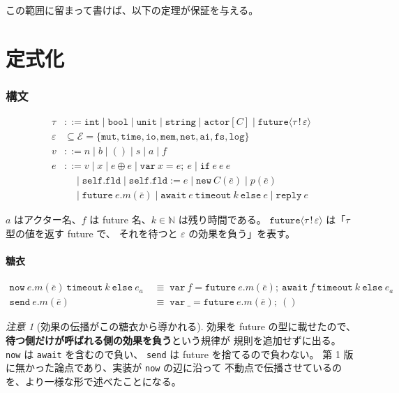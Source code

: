 \documentclass[11pt,a4paper]{ltjsarticle}
\theoremstyle{definition}
\theoremstyle{remark}
\newtheorem{remark}[theorem]{注意}
\newcommand{\tint}{\ensuremath{\mathtt{int}}}
\newcommand{\tbool}{\ensuremath{\mathtt{bool}}}
\newcommand{\tunit}{\ensuremath{\mathtt{unit}}}
\newcommand{\tstr}{\ensuremath{\mathtt{string}}}
\newcommand{\tact}[1]{\ensuremath{\mathtt{actor}[#1]}}
\newcommand{\tfut}[2]{\ensuremath{\mathtt{future}\langle #1 \,!\, #2 \rangle}}
\newcommand{\Eff}{\mathcal{E}}
\begin{document}
この範囲に留まって書けば、以下の定理が保証を与える。

\part{定式化}
\label{part:form}

\section{構文}

\begin{align*}
\tau &::= \tint \mid \tbool \mid \tunit \mid \tstr
        \mid \tact{C} \mid \tfut{\tau}{\varepsilon} \\
\varepsilon &\subseteq \Eff = \{\mathtt{mut},\mathtt{time},\mathtt{io},
        \mathtt{mem},\mathtt{net},\mathtt{ai},\mathtt{fs},\mathtt{log}\} \\[2pt]
v &::= n \mid b \mid () \mid s \mid a \mid f \\
e &::= v \mid x \mid e \oplus e
     \mid \mathtt{var}\ x = e;\ e
     \mid \mathtt{if}\ e\ e\ e \\
  &\quad \mid \mathtt{self}.\mathtt{fld} \mid \mathtt{self}.\mathtt{fld} := e
     \mid \mathtt{new}\ C(\bar e)
     \mid p(\bar e) \\
  &\quad \mid \mathtt{future}\ e.m(\bar e)
     \mid \mathtt{await}\ e\ \mathtt{timeout}\ k\ \mathtt{else}\ e
     \mid \mathtt{reply}\ e
\end{align*}

$a$ はアクター名、$f$ は future 名、$k \in \mathbb{N}$ は残り時間である。
$\tfut{\tau}{\varepsilon}$ は「$\tau$ 型の値を返す future で、
それを待つと $\varepsilon$ の効果を負う」を表す。

\subsection{糖衣}

\begin{align*}
\mathtt{now}\ e.m(\bar e)\ \mathtt{timeout}\ k\ \mathtt{else}\ e_a
&\;\equiv\;
\mathtt{var}\ f = \mathtt{future}\ e.m(\bar e);\
\mathtt{await}\ f\ \mathtt{timeout}\ k\ \mathtt{else}\ e_a \\
\mathtt{send}\ e.m(\bar e)
&\;\equiv\;
\mathtt{var}\ \_ = \mathtt{future}\ e.m(\bar e);\ ()
\end{align*}

\begin{remark}[効果の伝播がこの糖衣から導かれる]
\label{rem:prop}
効果を future の型に載せたので、
\textbf{待つ側だけが呼ばれる側の効果を負う}という規律が
規則を追加せずに出る。
\texttt{now} は \texttt{await} を含むので負い、
\texttt{send} は future を捨てるので負わない。
第 1 版に無かった論点であり、実装が \texttt{now} の辺に沿って
不動点で伝播させているのを、より一様な形で述べたことになる。
\end{remark}
\end{document}
